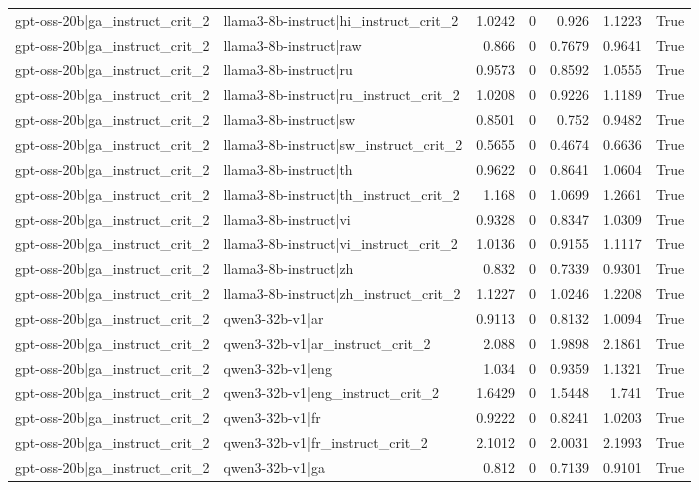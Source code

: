 \begin{table}
\begin{tabular}{l l r r r r l}
gpt-oss-20b|ga_instruct_crit_2 & llama3-8b-instruct|hi_instruct_crit_2 & 1.0242 & 0 & 0.926 & 1.1223 & True \\
gpt-oss-20b|ga_instruct_crit_2 & llama3-8b-instruct|raw & 0.866 & 0 & 0.7679 & 0.9641 & True \\
gpt-oss-20b|ga_instruct_crit_2 & llama3-8b-instruct|ru & 0.9573 & 0 & 0.8592 & 1.0555 & True \\
gpt-oss-20b|ga_instruct_crit_2 & llama3-8b-instruct|ru_instruct_crit_2 & 1.0208 & 0 & 0.9226 & 1.1189 & True \\
gpt-oss-20b|ga_instruct_crit_2 & llama3-8b-instruct|sw & 0.8501 & 0 & 0.752 & 0.9482 & True \\
gpt-oss-20b|ga_instruct_crit_2 & llama3-8b-instruct|sw_instruct_crit_2 & 0.5655 & 0 & 0.4674 & 0.6636 & True \\
gpt-oss-20b|ga_instruct_crit_2 & llama3-8b-instruct|th & 0.9622 & 0 & 0.8641 & 1.0604 & True \\
gpt-oss-20b|ga_instruct_crit_2 & llama3-8b-instruct|th_instruct_crit_2 & 1.168 & 0 & 1.0699 & 1.2661 & True \\
gpt-oss-20b|ga_instruct_crit_2 & llama3-8b-instruct|vi & 0.9328 & 0 & 0.8347 & 1.0309 & True \\
gpt-oss-20b|ga_instruct_crit_2 & llama3-8b-instruct|vi_instruct_crit_2 & 1.0136 & 0 & 0.9155 & 1.1117 & True \\
gpt-oss-20b|ga_instruct_crit_2 & llama3-8b-instruct|zh & 0.832 & 0 & 0.7339 & 0.9301 & True \\
gpt-oss-20b|ga_instruct_crit_2 & llama3-8b-instruct|zh_instruct_crit_2 & 1.1227 & 0 & 1.0246 & 1.2208 & True \\
gpt-oss-20b|ga_instruct_crit_2 & qwen3-32b-v1|ar & 0.9113 & 0 & 0.8132 & 1.0094 & True \\
gpt-oss-20b|ga_instruct_crit_2 & qwen3-32b-v1|ar_instruct_crit_2 & 2.088 & 0 & 1.9898 & 2.1861 & True \\
gpt-oss-20b|ga_instruct_crit_2 & qwen3-32b-v1|eng & 1.034 & 0 & 0.9359 & 1.1321 & True \\
gpt-oss-20b|ga_instruct_crit_2 & qwen3-32b-v1|eng_instruct_crit_2 & 1.6429 & 0 & 1.5448 & 1.741 & True \\
gpt-oss-20b|ga_instruct_crit_2 & qwen3-32b-v1|fr & 0.9222 & 0 & 0.8241 & 1.0203 & True \\
gpt-oss-20b|ga_instruct_crit_2 & qwen3-32b-v1|fr_instruct_crit_2 & 2.1012 & 0 & 2.0031 & 2.1993 & True \\
gpt-oss-20b|ga_instruct_crit_2 & qwen3-32b-v1|ga & 0.812 & 0 & 0.7139 & 0.9101 & True \\

\end{tabular}
\end{table}
